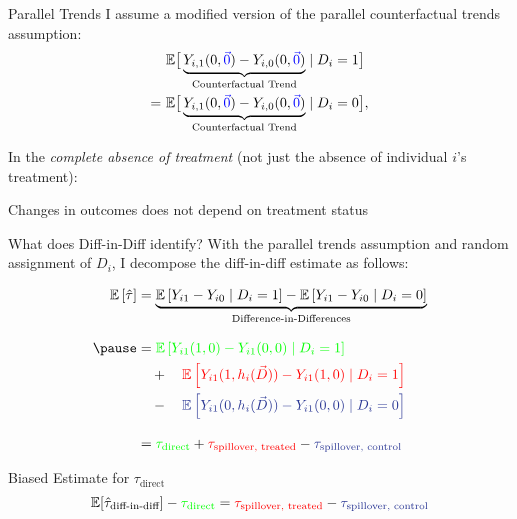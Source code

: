 \documentclass[aspectratio=169]{beamer}
\begin{document}
\begin{frame}{Parallel Trends}
    I assume a modified version of the parallel counterfactual trends assumption: 
    \begin{align*}
        &\mathbb{E}\big[ \underbrace{Y_{i,1}(0, \textcolor{blue}{\vec{0}}) - Y_{i,0}(0, \textcolor{blue}{\vec{0}})}_{\text{Counterfactual Trend}} \mid D_i = 1 \big] \\
        = \ &\mathbb{E}\big[ \underbrace{Y_{i,1}(0, \textcolor{blue}{\vec{0}}) - Y_{i,0}(0, \textcolor{blue}{\vec{0}})}_{\text{Counterfactual Trend}} \mid D_i = 0 \big],
    \end{align*}

    \vspace{5mm}
    In the \textit{complete absence of treatment }(not just the absence of individual $i$'s treatment):
    
    Changes in outcomes does not depend on treatment status
    
\end{frame}

\begin{frame}{What does Diff-in-Diff identify?}
    With the parallel trends assumption and random assignment of $D_i$, I decompose the diff-in-diff estimate as follows: 
        
    \begin{align*}
        \mathbb{E}\left[\hat{\tau}\right] &= \underbrace{\mathbb{E} \left[ Y_{i1} - Y_{i0} \mid D_i = 1 \right] - \mathbb{E} \left[ Y_{i1} - Y_{i0} \mid D_i = 0 \right]}_{\text{Difference-in-Differences}} \\[3mm]
        \pause&= 
        \textcolor{green}{\mathbb{E} \left[ Y_{i1}(1, 0) - Y_{i1}(0, 0) \mid D_i = 1 \right]} \\
        &\quad + \quad 
        \textcolor{red}{\mathbb{E} \left[ Y_{i1}(1, h_i(\vec{D})) - Y_{i1}(1, 0) \mid D_i = 1 \right]} \\ 
        &\quad - \quad  
        \textcolor{purple}{\mathbb{E} \left[ Y_{i1}(0, h_i(\vec{D})) - Y_{i1}(0, 0) \mid D_i = 0 \right]} \\[3mm]
        &= \textcolor{green}{\tau_{\text{direct}}} + \textcolor{red}{\tau_{\text{spillover, treated}}} - \textcolor{purple}{\tau_{\text{spillover, control}}}
    \end{align*}

\end{frame}

\begin{frame}{Biased Estimate for $\tau_{\text{direct}}$}
    \[ 
        \mathbb{E}[\hat{\tau}_{\text{diff-in-diff}}] - \textcolor{green}{\tau_{\text{direct}}} = \textcolor{red}{\tau_{\text{spillover, treated}}} - \textcolor{purple}{\tau_{\text{spillover, control}}}    
    \]
\end{frame}
\end{document}
